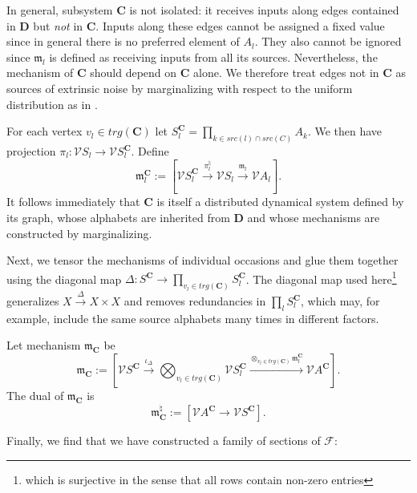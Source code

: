 \documentclass[12pt]{article}
\newcommand{\vecify}{{\mathcal V}}
\newcommand{\Act}{{A}}
\newcommand{\Sit}{{S}}
\newcommand{\occ}{{v}}
\newcommand{\univ}{{\mathbf D}}
\newcommand{\mangle}{{\mathbf C}}
\newcommand{\psheaf}{{\mathcal F}}
\newcommand{\fm}{{\mathfrak m}}
\theoremstyle{remark}
\begin{document}
In general, subsystem $\mangle$ is not isolated: it receives 
inputs along edges contained in $\univ$ but \emph{not} in 
$\mangle$. Inputs along these edges cannot be assigned a fixed 
value since in general there is no preferred element of 
$\Act_l$. They also cannot be ignored since $\fm_l$ is defined 
as receiving inputs from all its sources. Nevertheless, the 
mechanism of $\mangle$ should depend on $\mangle$ alone. We 
therefore treat edges not in $\mangle$ as sources of extrinsic 
noise by marginalizing with respect to the uniform distribution
as in %
. 

For each vertex $\occ_l\in trg(\mangle)$ let $\Sit^\mangle_l=
\prod_{k\in src(l)\cap src(C)} \Act_k$. We then have projection
$\pi_l:\vecify \Sit_l\rightarrow \vecify \Sit^\mangle_l$. 
Define
\begin{equation}
	\label{e:ind_occ}
	\fm^\mangle_l:=\left[\vecify \Sit^\mangle_l\xrightarrow
    {\pi_l^\natural}\vecify \Sit_l\xrightarrow{\fm_l}
    \vecify\Act_l\right].
\end{equation}
It follows immediately that $\mangle$ is itself a distributed 
dynamical system defined by its graph, whose alphabets are 
inherited from $\univ$ and whose mechanisms are constructed 
by marginalizing.

Next, we tensor the mechanisms of individual occasions and glue
them together using the diagonal map  $\Delta:\Sit^\mangle
\rightarrow \prod_{v_l\in trg(\mangle)}\Sit^\mangle_l$. The 
diagonal map used here\footnote{which is surjective in the 
sense that all rows contain non-zero entries} generalizes 
$X\xrightarrow{\Delta}X\times X$ and removes redundancies in 
$\prod_l \Sit^\mangle_l$, which may, for example, include the 
same source alphabets many times in different factors.

Let mechanism $\fm_\mangle$ be
\begin{equation}
	\label{e:m_mech}
	\fm_\mangle:=\left[\vecify \Sit^\mangle\xrightarrow
    {\iota_\Delta}\bigotimes_{\occ_l\in trg(\mangle)}\vecify 
    \Sit^\mangle_l\xrightarrow{\otimes_{\occ_l\in 
    trg(\mangle)}\fm^\mangle_l}\vecify\Act^\mangle\right].
\end{equation}
The dual of $\fm_\mangle$ is 
\begin{equation}
	\label{e:measurement}
	\fm_\mangle^\natural:=\left[\vecify\Act^\mangle\rightarrow 
    \vecify \Sit^\mangle\right].
\end{equation}

Finally, we find that we have constructed a family of sections 
of $\psheaf$:
\end{document}
